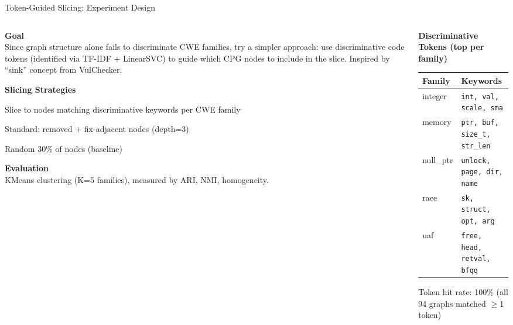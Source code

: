 \documentclass[aspectratio=169,10pt]{beamer}
\begin{document}
\begin{frame}{Token-Guided Slicing: Experiment Design}
\begin{columns}[T]
\begin{column}{0.50\textwidth}

  \textbf{Goal}\\[3pt]
  {\small Since graph structure alone fails to discriminate CWE families,
  try a simpler approach: use discriminative code tokens (identified via
  TF-IDF + LinearSVC) to guide which CPG nodes to include in the slice.
  Inspired by ``sink'' concept from VulChecker.}

  \vspace{0.5em}
  \textbf{Slicing Strategies}
  \begin{description}
    \item[\textbf{token\_guided}] Slice to nodes matching discriminative keywords per CWE family
    \item[\textbf{diff\_based}] Standard: removed + fix-adjacent nodes (depth=3)
    \item[\textbf{random}] Random 30\% of nodes (baseline)
  \end{description}

  \vspace{0.3em}
  \textbf{Evaluation}\\[3pt]
  {\small KMeans clustering (K=5 families), measured by ARI, NMI, homogeneity.}

\end{column}
\begin{column}{0.47\textwidth}

  {\small\textbf{Discriminative Tokens (top per family)}}\\[4pt]
  {\scriptsize
  \renewcommand{\arraystretch}{1.2}
  \begin{tabular}{p{1.8cm}p{4.0cm}}
    \toprule
    \textbf{Family} & \textbf{Keywords} \\
    \midrule
    integer & \texttt{int, val, scale, sma} \\
    memory & \texttt{ptr, buf, size\_t, str\_len} \\
    null\_ptr & \texttt{unlock, page, dir, name} \\
    race & \texttt{sk, struct, opt, arg} \\
    uaf & \texttt{free, head, retval, bfqq} \\
    \bottomrule
  \end{tabular}}

  \vspace{0.4em}
  {\scriptsize Token hit rate: 100\% (all 94 graphs matched $\geq$1 token)}

\end{column}
\end{columns}
\end{frame}
\end{document}
